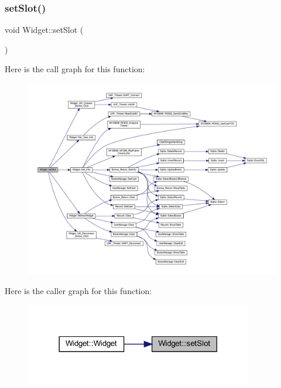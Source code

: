 \subsubsection{\texorpdfstring{setSlot()}{setSlot()}}
{\footnotesize\ttfamily void Widget\+::set\+Slot (\begin{DoxyParamCaption}{ }\end{DoxyParamCaption})}

Here is the call graph for this function\+:
\nopagebreak
\begin{figure}[H]
\begin{center}
\leavevmode
\includegraphics[width=350pt]{class_widget_ac60c5a62bc3197fbc7ade8f40df70c70_cgraph}
\end{center}
\end{figure}
Here is the caller graph for this function\+:
\nopagebreak
\begin{figure}[H]
\begin{center}
\leavevmode
\includegraphics[width=282pt]{class_widget_ac60c5a62bc3197fbc7ade8f40df70c70_icgraph}
\end{center}
\end{figure}
\mbox{\label{class_widget_acceb5443a97ee9023250cda33f183bef}} 
